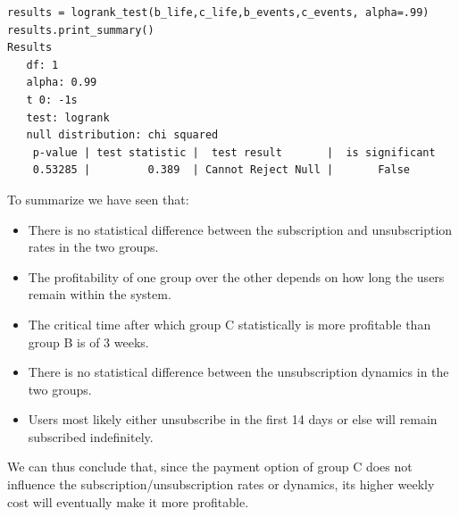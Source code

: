 \documentclass[paper=a4, fontsize=10pt]{report}
\begin{document}
\scriptsize
\begin{lstlisting}[frame=single,caption=LogRank test \label{code:python_logRank}]
results = logrank_test(b_life,c_life,b_events,c_events, alpha=.99)
results.print_summary()
Results
   df: 1
   alpha: 0.99
   t 0: -1s
   test: logrank
   null distribution: chi squared
    p-value | test statistic |  test result       |  is significant
    0.53285 |         0.389  | Cannot Reject Null |       False       

\end{lstlisting}



\normalsize
To summarize we have seen that:
\begin{itemize}
 \item There is no statistical difference between the subscription and unsubscription rates in the two groups.
 \item The profitability of one group over the other depends on how long the users remain within the system.
 \item The critical time after which group C statistically is more profitable than group B is of 3 weeks.
  \item There is no statistical difference between the unsubscription dynamics in the two groups.
 \item Users most likely either unsubscribe in the first 14 days or else will remain subscribed indefinitely.
\end{itemize}

We can thus conclude that, since the payment option of group C does not influence the subscription/unsubscription rates or dynamics, its
higher weekly cost will eventually make it more profitable.
\end{document}
